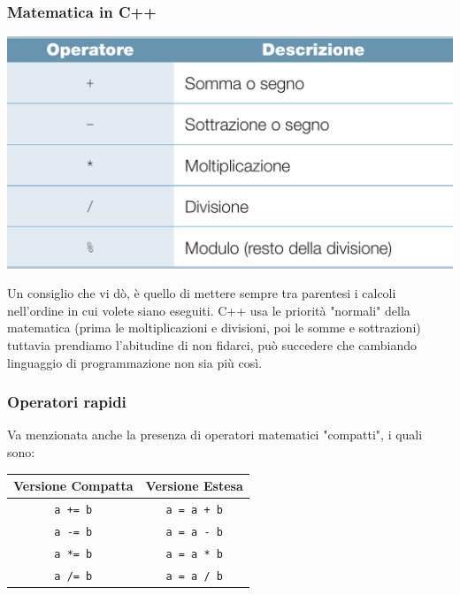 \documentclass[handout]{beamer}
\begin{document}
    \begin{frame}
        \frametitle{Matematica in C++}
        \begin{center}
            \includegraphics[scale=0.17]{img/operators.png}
        \end{center}
        Un consiglio che vi dò, è quello di mettere sempre tra parentesi i calcoli nell'ordine in cui volete siano eseguiti. C++ usa le priorità "normali" della matematica (prima le moltiplicazioni e divisioni, poi le somme e sottrazioni) tuttavia prendiamo l'abitudine di non fidarci, può succedere che cambiando linguaggio di programmazione non sia più così.
    \end{frame}

    \begin{frame}[fragile]
        \frametitle{Operatori rapidi}
        Va menzionata anche la presenza di operatori matematici "compatti", i quali sono:
        \begin{table}
            \begin{tabular}{c | c}
                Versione Compatta & Versione Estesa \\
                \hline
                \texttt{a += b} & \texttt{a = a + b} \\
                \texttt{a -= b} & \texttt{a = a - b} \\
                \texttt{a *= b} & \texttt{a = a * b} \\
                \texttt{a /= b} & \texttt{a = a / b} \\
            \end{tabular}
        \end{table}
    \end{frame}
\end{document}
